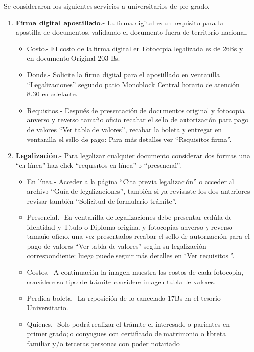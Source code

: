 \documentclass[letter, openright, 12pt]{book}
\begin{document}
Se consideraron los siguientes servicios a universitarios de pre grado. 
\begin{enumerate}[label=(\alph*)]
\item \textbf{Firma digital apostillado}.- La firma digital es un requisito para la apostilla de documentos, validando el documento fuera de territorio nacional.
\begin{itemize}
\item Costo.- El costo de la firma digital en Fotocopia legalizada es de 26Bs y en documento Original 203 Bs.
\item Donde.- Solicite la firma digital para el apostillado en ventanilla “Legalizaciones” segundo patio Monoblock Central horario de atención 8:30 en adelante.
\item Requisitos.- Después de presentación de documentos original y fotocopia anverso y reverso tamaño oficio recabar el sello de autorización para pago de valores “Ver tabla de valores”, recabar la boleta y entregar en ventanilla el sello de pago: Para más detalles ver “Requisitos firma”.
\end{itemize} 

\item \textbf{Legalización}.- Para legalizar cualquier documento considerar dos formas una “en línea” haz click “requisitos en línea” o “presencial”.
\begin{itemize}
\item En línea.- Acceder a la página “Cita previa legalización” o acceder al archivo “Guía de legalizaciones”, también si ya revisaste los dos anteriores revisar también “Solicitud de formulario trámite”.
\item Presencial.- En ventanilla de legalizaciones debe presentar cedúla de identidad y  Título o Diploma original y fotocopias anverso y reverso tamaño oficio, una vez presentados recabar el sello de autorización para el pago de valores “Ver tabla de valores” según su legalización correspondiente; luego puede seguir más detalles en “Ver requisitos ”.
\item Costos.- A continuación la imagen muestra los costos de cada fotocopia, considere su tipo de trámite considere imagen tabla de valores.
\item Perdida boleta.- La reposición de lo cancelado 17Bs en el tesorio Universitario.
\item Quienes.- Solo podrá realizar el trámite el interesado o parientes en primer grado; o conyugues con certificado de matrimonio o libreta familiar y/o terceras personas con poder notariado
\end{itemize}
\end{enumerate}
\end{document}
